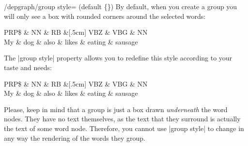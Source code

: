 \documentclass[a4paper]{ltxdoc}
\begin{document}
\begin{stylekey}{/depgraph/group style= (default \{\})}
   By default, when you create a group you will only see a box with rounded corners around the selected words:
\begin{codeexample}[]
   \begin{dependency}
   \begin{deptext}[column sep=.5cm, row sep=.1ex]
      PRP\$ \& NN \& RB \&[.5cm] VBZ \& VBG \& NN \\
      My \& dog \& also \& likes \& eating \& sausage \\
   \end{deptext}
\end{dependency}
\end{codeexample}
The |group style| property allows you to redefine this style according to your taste and needs:
\begin{codeexample}[]
   \begin{dependency}
   \begin{deptext}[column sep=.5cm, row sep=.5ex]
      PRP\$ \& NN \& RB \&[.5cm] VBZ \& VBG \& NN \\
      My \& dog \& also \& likes \& eating \& sausage \\
   \end{deptext}
\end{dependency}
\end{codeexample}
Please, keep in mind that a group is just a box drawn \emph{underneath} the word nodes. They have no text themselves, as the text that they surround is actually the text of some word node. Therefore, you cannot use |group style| to change in any way the rendering of the words they group.
\end{stylekey}
\end{document}
